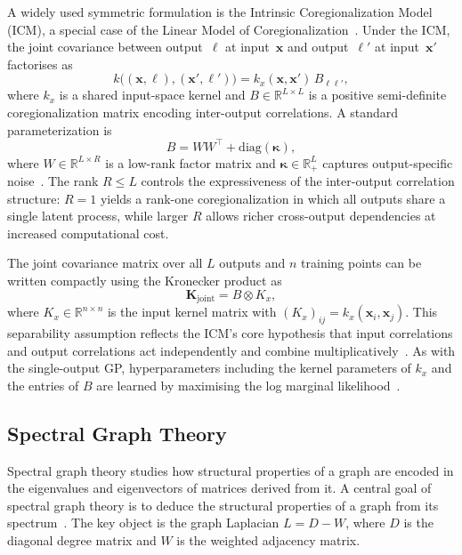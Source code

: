 \documentclass[11pt]{article}
\begin{document}
A widely used symmetric formulation is the Intrinsic Coregionalization 
Model (ICM), a special case of the Linear Model of 
Coregionalization~\parencite{journel1978mining, matheron1982pour, 
goulard1992linear}. Under the ICM, the joint covariance between 
output~$\ell$ at input~$\mathbf{x}$ and output~$\ell'$ at 
input~$\mathbf{x}'$ factorises as
\[
k\bigl((\mathbf{x},\ell),(\mathbf{x}',\ell')\bigr)
= k_x(\mathbf{x},\mathbf{x}')\, B_{\ell\ell'},
\]
where $k_x$ is a shared input-space kernel and $B \in \mathbb{R}^{L 
\times L}$ is a positive semi-definite coregionalization matrix encoding 
inter-output correlations. A standard parameterization is
\[
B = WW^\top + \mathrm{diag}(\boldsymbol{\kappa}),
\]
where $W \in \mathbb{R}^{L \times R}$ is a low-rank factor matrix and 
$\boldsymbol{\kappa} \in \mathbb{R}^{L}_{+}$ captures output-specific 
noise~\parencite{bonilla2008multitask}. The rank $R \leq L$ controls the 
expressiveness of the inter-output correlation structure: $R = 1$ yields a 
rank-one coregionalization in which all outputs share a single latent 
process, while larger $R$ allows richer cross-output dependencies at 
increased computational cost.

The joint covariance matrix over all $L$ outputs and $n$ training points
can be written compactly using the Kronecker product as
\[
\mathbf{K}_{\mathrm{joint}} = B \otimes K_x,
\]
where $K_x \in \mathbb{R}^{n \times n}$ is the input kernel matrix with
$(K_x)_{ij} = k_x(\mathbf{x}_i, \mathbf{x}_j)$. This separability
assumption reflects the ICM's core hypothesis that input correlations and
output correlations act independently and combine
multiplicatively~\parencite{alvarez2012kernels}. As with the single-output
GP, hyperparameters including the kernel parameters of $k_x$ and the
entries of $B$ are learned by maximising the log marginal
likelihood~\parencite{rasmussen2006gaussian}.







\subsection{Spectral Graph Theory}
\label{sec:prelim_spectral}

Spectral graph theory studies how structural properties of a graph are 
encoded in the eigenvalues and eigenvectors of matrices derived from it. 
A central goal of spectral graph theory is to deduce the structural 
properties of a graph from its spectrum~\parencite{chung1997}.
The key object is the graph Laplacian $L = D - W$, where $D$ is the 
diagonal degree matrix and $W$ is the weighted adjacency matrix.
\end{document}
